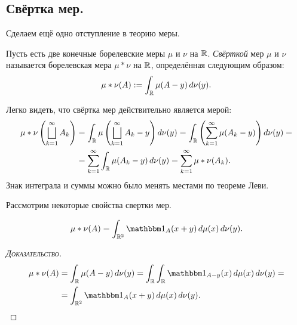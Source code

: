 \documentclass[../main.tex]{subfiles}
\begin{document}
\subsection{Свёртка мер.}

Сделаем ещё одно отступление в теорию меры.

\begin{df}
 Пусть есть две конечные борелевские меры $ \mu $ и $ \nu $ на $ \mathbb{R} $. \textit{Свёрткой} мер $ \mu $ и $ \nu $ называется борелевская мера $ \mu \ast \nu $ на $ \mathbb{R} $, определённая следующим образом:
 \begin{align*}
  \mu \ast \nu(A) := \int_{\mathbb{R}} \mu(A - y) \,d\nu(y).
 \end{align*} 
\end{df}
\begin{remrk}
 Легко видеть, что свёртка мер действительно является мерой:
 \begin{align*}
  \mu\ast\nu \left( \bigsqcup_{k=1}^{\infty}A_k \right) &= \int_{\mathbb{R}} \mu \left( \bigsqcup_{k=1}^{\infty}A_k - y \right) d\nu(y) = \int_{\mathbb{R}} \left( \sum_{k=1}^{\infty} \mu(A_k - y) \right) d\nu(y) = \\
  &= \sum_{k=1}^{\infty} \int_{\mathbb{R}} \mu(A_k - y) \,d\nu(y) = \sum_{k=1}^{\infty}\mu \ast \nu(A_k).
 \end{align*} Знак интеграла и суммы можно было менять местами по теореме Леви.
\end{remrk}

Рассмотрим некоторые свойства свертки мер.

\begin{prop}
 \begin{align}
  \label{equation:measure_convolution_double_integral}
  \mu\ast\nu(A) = \int_{\R^{2}} \Ind_A(x + y)\,d\mu(x)\,d\nu(y).
 \end{align} 
\end{prop}
\begin{proof}[\normalfont\textsc{Доказательство}]
 \begin{align*}
  \mu\ast\nu(A)&=\int_{\R} \mu(A-y)\,d\nu(y) = \int_{\R} \int_{\R} \Ind_{A-y}  (x)\,d\mu(x)\,d\nu(y) = \\
  &= \int_{\R^{2}} \Ind_A(x+y)\,d\mu(x)\,d\nu(y). 
 \end{align*} 
\end{proof}
\end{document}
